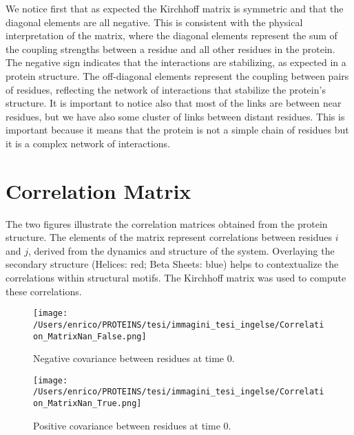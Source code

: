 \documentclass[English, Lau, oneside]{sapthesis}
\begin{document}
We notice first that as expected the Kirchhoff matrix is symmetric and that the diagonal elements are all negative. This is consistent with the physical interpretation of the matrix, where the diagonal elements represent the sum of the coupling strengths between a residue and all other residues in the protein. The negative sign indicates that the interactions are stabilizing, as expected in a protein structure. The off-diagonal elements represent the coupling between pairs of residues, reflecting the network of interactions that stabilize the protein's structure.
It is important to notice also that most of the links are between near residues, but we have also some cluster of links between distant residues. This is important because it means that the protein is not a simple chain of residues but it is a complex network of interactions.
\newpage



\section{Correlation Matrix}
\noindent The two figures illustrate the correlation matrices obtained from the protein structure. The elements of the matrix represent correlations between residues \(i\) and \(j\), derived from the dynamics and structure of the system. Overlaying the secondary structure (Helices: red; Beta Sheets: blue) helps to contextualize the correlations within structural motifs. The Kirchhoff matrix was used to compute these correlations.
\begin{figure}[h!]
    \centering
    \texttt{[image: /Users/enrico/PROTEINS/tesi/immagini\_tesi\_ingelse/Correlation\_MatrixNan\_False.png]}\label{fig:correlation_negative}
    \caption{Negative covariance between residues at time 0.}
\end{figure}
\begin{figure}[h!]
    \centering
    \texttt{[image: /Users/enrico/PROTEINS/tesi/immagini\_tesi\_ingelse/Correlation\_MatrixNan\_True.png]}\label{fig:correlation_positive}
    \caption{Positive covariance between residues at time 0.}
\end{figure}
\end{document}
